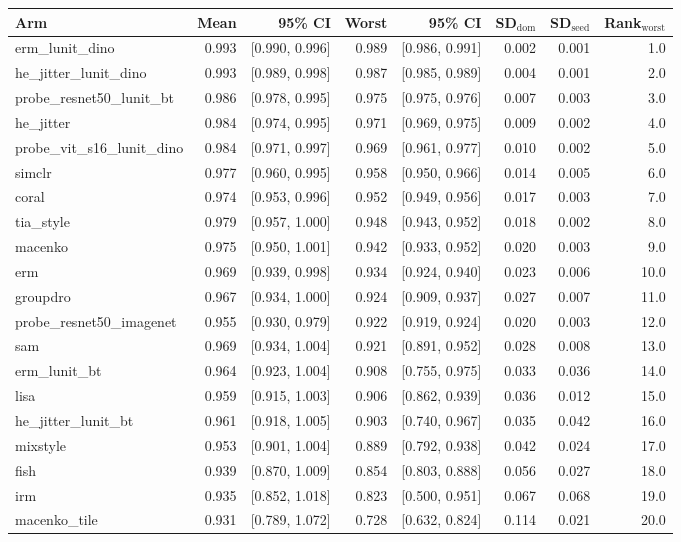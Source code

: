 \begin{tabular}{lrrrrrrr}
\toprule
Arm & Mean & 95\% CI & Worst & 95\% CI & SD$_\text{dom}$ & SD$_\text{seed}$ & Rank$_\text{worst}$ \\
\midrule
erm\_lunit\_dino & 0.993 & [0.990, 0.996] & 0.989 & [0.986, 0.991] & 0.002 & 0.001 & 1.0 \\
he\_jitter\_lunit\_dino & 0.993 & [0.989, 0.998] & 0.987 & [0.985, 0.989] & 0.004 & 0.001 & 2.0 \\
probe\_resnet50\_lunit\_bt & 0.986 & [0.978, 0.995] & 0.975 & [0.975, 0.976] & 0.007 & 0.003 & 3.0 \\
he\_jitter & 0.984 & [0.974, 0.995] & 0.971 & [0.969, 0.975] & 0.009 & 0.002 & 4.0 \\
probe\_vit\_s16\_lunit\_dino & 0.984 & [0.971, 0.997] & 0.969 & [0.961, 0.977] & 0.010 & 0.002 & 5.0 \\
simclr & 0.977 & [0.960, 0.995] & 0.958 & [0.950, 0.966] & 0.014 & 0.005 & 6.0 \\
coral & 0.974 & [0.953, 0.996] & 0.952 & [0.949, 0.956] & 0.017 & 0.003 & 7.0 \\
tia\_style & 0.979 & [0.957, 1.000] & 0.948 & [0.943, 0.952] & 0.018 & 0.002 & 8.0 \\
macenko & 0.975 & [0.950, 1.001] & 0.942 & [0.933, 0.952] & 0.020 & 0.003 & 9.0 \\
erm & 0.969 & [0.939, 0.998] & 0.934 & [0.924, 0.940] & 0.023 & 0.006 & 10.0 \\
groupdro & 0.967 & [0.934, 1.000] & 0.924 & [0.909, 0.937] & 0.027 & 0.007 & 11.0 \\
probe\_resnet50\_imagenet & 0.955 & [0.930, 0.979] & 0.922 & [0.919, 0.924] & 0.020 & 0.003 & 12.0 \\
sam & 0.969 & [0.934, 1.004] & 0.921 & [0.891, 0.952] & 0.028 & 0.008 & 13.0 \\
erm\_lunit\_bt & 0.964 & [0.923, 1.004] & 0.908 & [0.755, 0.975] & 0.033 & 0.036 & 14.0 \\
lisa & 0.959 & [0.915, 1.003] & 0.906 & [0.862, 0.939] & 0.036 & 0.012 & 15.0 \\
he\_jitter\_lunit\_bt & 0.961 & [0.918, 1.005] & 0.903 & [0.740, 0.967] & 0.035 & 0.042 & 16.0 \\
mixstyle & 0.953 & [0.901, 1.004] & 0.889 & [0.792, 0.938] & 0.042 & 0.024 & 17.0 \\
fish & 0.939 & [0.870, 1.009] & 0.854 & [0.803, 0.888] & 0.056 & 0.027 & 18.0 \\
irm & 0.935 & [0.852, 1.018] & 0.823 & [0.500, 0.951] & 0.067 & 0.068 & 19.0 \\
macenko\_tile & 0.931 & [0.789, 1.072] & 0.728 & [0.632, 0.824] & 0.114 & 0.021 & 20.0 \\
\bottomrule
\end{tabular}

